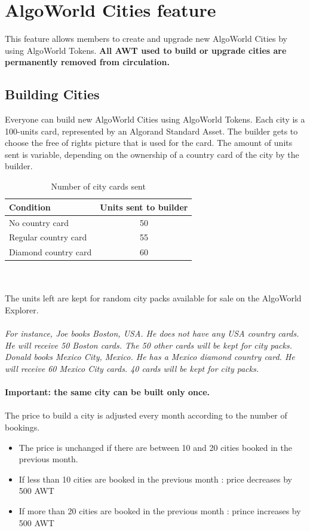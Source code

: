 \documentclass{article}
\begin{document}
\newpage
\section{AlgoWorld Cities feature}
\label{sec:algoworld-cities-feature}

This feature allows members to create and upgrade new AlgoWorld Cities by using AlgoWorld Tokens. \textbf{All AWT used to build or upgrade cities are permanently removed from circulation.}

\subsection{Building Cities}
\label{ssec:building-cities}

Everyone can build new AlgoWorld Cities using AlgoWorld Tokens. Each city is a 100-units card, represented by an Algorand Standard Asset. The builder gets to choose the free of rights picture that is used for the card.
The amount of units sent is variable, depending on the ownership of a country card of the city by the builder.
\begin{table}[ht]
\centering
\begin{tabular}{l|c}
Condition & Units sent to builder \\\hline
No country card & 50 \\
Regular country card & 55 \\
Diamond country card & 60
\end{tabular}
\caption{\label{tab:widgets}Number of city cards sent}
\end{table}
\\
\\
The units left are kept for random city packs available for sale on the AlgoWorld Explorer.
\\
\\
\textit{For instance, Joe books Boston, USA. He does not have any USA country cards. He will receive 50 Boston cards. The 50 other cards will be kept for city packs. Donald books Mexico City, Mexico. He has a Mexico diamond country card. He will receive 60 Mexico City cards. 40 cards will be kept for city packs.}
\\
\\
\textbf{Important: the same city can be built only once.}
\\
\\
The price to build a city is adjusted every month according to the number of bookings.

\begin{itemize}
\item The price is unchanged if there are between 10 and 20 cities booked in the previous month.
\item If less than 10 cities are booked in the previous month : price decreases by 500 AWT
\item If more than 20 cities are booked in the previous month : prince increases by 500 AWT
\end{itemize}
\end{document}
